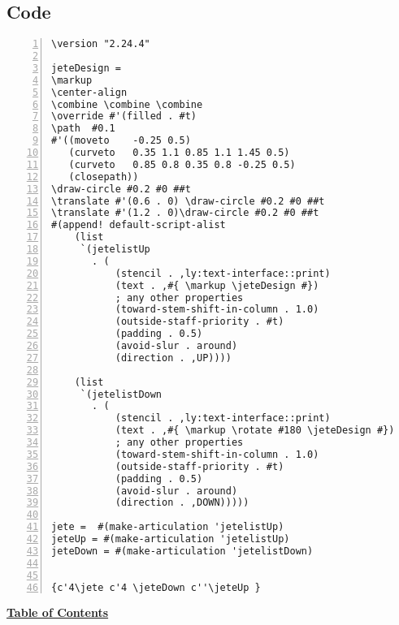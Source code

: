 \subsection{Code}
\begin{Verbatim}[numbers=left,xleftmargin=5mm]
\version "2.24.4"

jeteDesign =
\markup
\center-align
\combine \combine \combine
\override #'(filled . #t)
\path  #0.1
#'((moveto    -0.25 0.5)
   (curveto   0.35 1.1 0.85 1.1 1.45 0.5)
   (curveto   0.85 0.8 0.35 0.8 -0.25 0.5)
   (closepath))
\draw-circle #0.2 #0 ##t
\translate #'(0.6 . 0) \draw-circle #0.2 #0 ##t
\translate #'(1.2 . 0)\draw-circle #0.2 #0 ##t
#(append! default-script-alist
    (list
     `(jetelistUp
       . (
           (stencil . ,ly:text-interface::print)
           (text . ,#{ \markup \jeteDesign #})
           ; any other properties
           (toward-stem-shift-in-column . 1.0)
           (outside-staff-priority . #t)
           (padding . 0.5)
           (avoid-slur . around)
           (direction . ,UP))))

    (list
     `(jetelistDown
       . (
           (stencil . ,ly:text-interface::print)
           (text . ,#{ \markup \rotate #180 \jeteDesign #})
           ; any other properties
           (toward-stem-shift-in-column . 1.0)
           (outside-staff-priority . #t)
           (padding . 0.5)
           (avoid-slur . around)
           (direction . ,DOWN)))))

jete =  #(make-articulation 'jetelistUp)
jeteUp = #(make-articulation 'jetelistUp)
jeteDown = #(make-articulation 'jetelistDown)


{c'4\jete c'4 \jeteDown c''\jeteUp }
\end{Verbatim}
\hyperref[sec:toc]{\textbf{Table of Contents}}
\vfill \break



